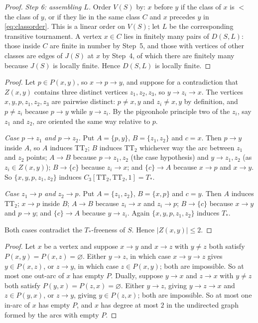 \documentclass[11pt,a4paper]{article}
\theoremstyle{plain}
\theoremstyle{definition}
\theoremstyle{remark}
\newcommand{\Tstar}{T_{\ast}}
\newcommand{\TT}{\mathrm{TT}}
\begin{document}
\begin{proof}
\emph{Step 6: assembling $L$.} Order $V(S)$ by: $x$ before $y$ if the class of $x$ is $<$ the class of $y$, or if they lie in the same class $C$ and $x$ precedes $y$ in \eqref{eq:classorder}. This is a linear order on $V(S)$; let $L$ be the corresponding transitive tournament. A vertex $x\in C$ lies in finitely many pairs of $D(S,L)$: those inside $C$ are finite in number by Step~5, and those with vertices of other classes are edges of $J(S)$ at $x$ by Step~4, of which there are finitely many because $J(S)$ is locally finite. Hence $D(S,L)$ is locally finite.
\end{proof}

\label{pf:Z}
\lemZ*
\begin{proof}
Let $p\in P(x,y)$, so $x\to p\to y$, and suppose for a contradiction that $Z(x,y)$ contains three distinct vertices $z_1,z_2,z_3$, so $y\to z_i\to x$. The vertices $x,y,p,z_1,z_2,z_3$ are pairwise distinct: $p\ne x,y$ and $z_i\ne x,y$ by definition, and $p\ne z_i$ because $p\to y$ while $y\to z_i$. By the pigeonhole principle two of the $z_i$, say $z_1$ and $z_2$, are oriented the same way relative to $p$.

\emph{Case $p\to z_1$ and $p\to z_2$.} Put $A=\{p,y\}$, $B=\{z_1,z_2\}$ and $c=x$. Then $p\to y$ inside $A$, so $A$ induces $\TT_2$; $B$ induces $\TT_2$ whichever way the arc between $z_1$ and $z_2$ points; $A\to B$ because $p\to z_1,z_2$ (the case hypothesis) and $y\to z_1,z_2$ (as $z_i\in Z(x,y)$); $B\to\{c\}$ because $z_i\to x$; and $\{c\}\to A$ because $x\to p$ and $x\to y$. So $\{x,y,p,z_1,z_2\}$ induces $C_3[\TT_2,\TT_2,1]=\Tstar$.

\emph{Case $z_1\to p$ and $z_2\to p$.} Put $A=\{z_1,z_2\}$, $B=\{x,p\}$ and $c=y$. Then $A$ induces $\TT_2$; $x\to p$ inside $B$; $A\to B$ because $z_i\to x$ and $z_i\to p$; $B\to\{c\}$ because $x\to y$ and $p\to y$; and $\{c\}\to A$ because $y\to z_i$. Again $\{x,y,p,z_1,z_2\}$ induces $\Tstar$.

Both cases contradict the $\Tstar$-freeness of $S$. Hence $|Z(x,y)|\le 2$.
\end{proof}

\label{pf:Pempty}
\lemPempty*
\begin{proof}
Let $x$ be a vertex and suppose $x\to y$ and $x\to z$ with $y\ne z$ both satisfy $P(x,y)=P(x,z)=\varnothing$. Either $y\to z$, in which case $x\to y\to z$ gives $y\in P(x,z)$, or $z\to y$, in which case $z\in P(x,y)$; both are impossible. So at most one out-arc of $x$ has empty $P$. Dually, suppose $y\to x$ and $z\to x$ with $y\ne z$ both satisfy $P(y,x)=P(z,x)=\varnothing$. Either $y\to z$, giving $y\to z\to x$ and $z\in P(y,x)$, or $z\to y$, giving $y\in P(z,x)$; both are impossible. So at most one in-arc of $x$ has empty $P$, and $x$ has degree at most $2$ in the undirected graph formed by the arcs with empty $P$.
\end{proof}
\end{document}
